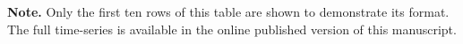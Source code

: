 \begin{landscape}
\begin{table}
\begin{tabular}{ccccccccccccc}
\hline
\end{tabular}
\begin{list}{}{}
\item {\bf{Note.}}
  Only the first ten rows of this table are shown to demonstrate its format. The full time-series is available in
  the online published version of this manuscript.
\end{list}
\end{table}
\clearpage
\end{landscape}
